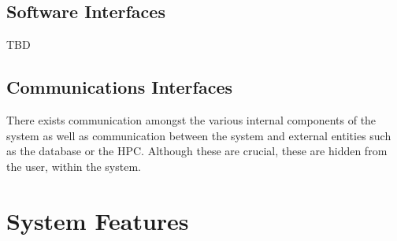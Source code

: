 \documentclass{scrreprt}
\begin{document}
\section{Software Interfaces}

TBD

\section{Communications Interfaces}

There exists communication amongst the various internal components of the system as well as communication between the system and external entities such as the database or the HPC. Although these are crucial, these are hidden from the user, within the system.

\chapter{System Features}
\end{document}
